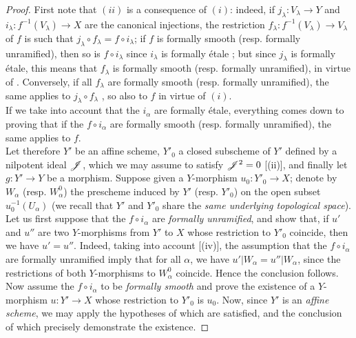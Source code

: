 \begin{proof}
First note that $(ii)$ is a consequence of $(i)$: indeed, if $j_\lambda: V_\lambda \to Y$ and $i_\lambda: f^{-1}(V_\lambda) \to X$ are the canonical injections, the restriction $f_\lambda : f^{-1}(V_\lambda) \to V_\lambda$ of $f$ is such that $j_\lambda \circ f_\lambda = f \circ i_\lambda$; if $f$ is formally smooth (resp. formally unramified), then so is $f \circ i_\lambda$ since $i_\lambda$ is formally \'etale ; but since $j_\lambda$ is formally \'etale, this means that $f_\lambda$ is formally smooth (resp. formally unramified), in virtue of . 
Conversely, if all $f_\lambda$ are formally smooth (resp. formally unramified), the same applies to $j_\lambda \circ f_\lambda$ , so also to $f$ in virtue of $(i)$.\\

If we take into account that the $i_\alpha$ are formally \'etale, everything comes down to proving that if the $f \circ i_\alpha$ are formally smooth (resp. formally unramified), the same applies to $f$.\\

Let therefore $Y'$ be an affine scheme, $Y'_0$ a closed subscheme of $Y'$ defined by a nilpotent ideal $\mathscr{J}$, which we may assume to satisfy $\mathscr{J}^2 = 0$ [(ii)], and finally let $g : Y' \to Y$ be a morphism. 
Suppose given a $Y$-morphism $u_0 : Y'_0 \to X$; denote by $W_\alpha$ (resp. $W^0 _\alpha$) the prescheme induced by $Y'$ (resp. $Y'_0$) on the open subset $u_0 ^{-1}(U_\alpha)$ (we recall that $Y'$ and $Y'_0$ share the \emph{same underlying topological space}). 
Let us first suppose that the $f \circ i_\alpha$ are \emph{formally unramified}, and show that, if $u'$ and $u''$ are two $Y$-morphisms from $Y'$ to $X$ whose restriction to $Y'_0$ coincide, then we have $u' = u''$. 
Indeed, taking into account [(iv)], the assumption that the $f \circ i_\alpha$ are formally unramified imply that for all $\alpha$, we have $u'|W_\alpha = u''|W_\alpha$, since the restrictions of both $Y$-morphisms to $W^0 _\alpha$ coincide. 
Hence the conclusion follows.\\

Now assume the $f \circ i_\alpha$ to be \emph{formally smooth} and prove the existence of a $Y$-morphism $u : Y' \to X$ whose restriction to $Y'_0$ is $u_0$. 
Now, since $Y'$ is an \emph{affine scheme}, we may apply  the hypotheses of which are satisfied, and the conclusion of which precisely demonstrate the existence.
\end{proof}

